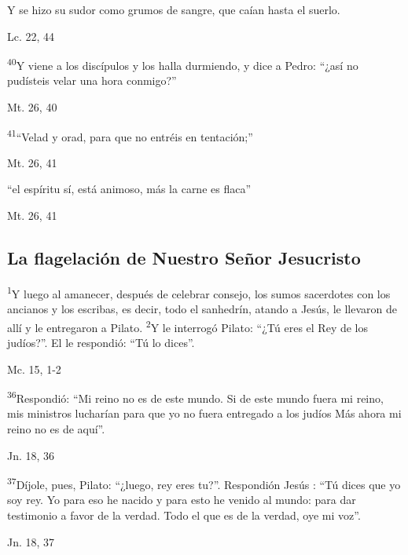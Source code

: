 \documentclass[a4paper,11pt]{article}
\begin{document}
      Y se hizo su sudor como grumos de sangre, que caían hasta el suerlo.
      \begin{flushright}
        Lc. 22, 44
      \end{flushright}

      \textsuperscript{40}Y viene a los discípulos y los halla durmiendo, y dice a Pedro: ``¿así no pudísteis velar una hora conmigo?''
      \begin{flushright}
        Mt. 26, 40
      \end{flushright}

      \textsuperscript{41}``Velad y orad, para que no entréis en tentación;''
      \begin{flushright}
        Mt. 26, 41
      \end{flushright}

      ``el espíritu sí, está animoso, más la carne es flaca''
      \begin{flushright}
        Mt. 26, 41
      \end{flushright}

    \subsection*{\hfil La flagelación de Nuestro Señor Jesucristo \hfil}
      
      \textsuperscript{1}Y luego al amanecer, después de celebrar consejo, los sumos sacerdotes con los ancianos y los escribas, es decir, todo el sanhedrín, atando a Jesús,
      le llevaron de allí y le entregaron a Pilato. \textsuperscript{2}Y le interrogó Pilato: ``¿Tú eres el Rey de los judíos?''. El le respondió: ``Tú lo dices''.
      \begin{flushright}
        Mc. 15, 1-2
      \end{flushright}

      \textsuperscript{36}Respondió: ``Mi reino no es de este mundo. Si de este mundo fuera mi reino, mis ministros lucharían para que yo no fuera entregado a los judíos
      Más ahora mi reino no es de aquí''.
      \begin{flushright}
        Jn. 18, 36
      \end{flushright}

      \textsuperscript{37}Díjole, pues, Pilato: ``¿luego, rey eres tu?''. Respondión Jesús : ``Tú dices que yo soy rey. Yo para eso he nacido y para esto he venido
      al mundo: para dar testimonio a favor de la verdad. Todo el que es de la verdad, oye mi voz''.
      \begin{flushright}
        Jn. 18, 37
      \end{flushright}
\end{document}
